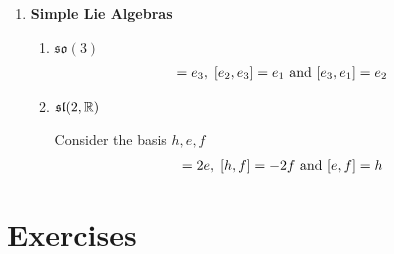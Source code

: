 \documentclass[12pt,a4paper]{report}
\begin{document}
\begin{description}
\begin{enumerate}
		\item \textbf{Simple Lie Algebras}
		
		\begin{enumerate}
			\item $\mathfrak{so}(3)$
				\begin{align*}
					[e_1, e_2] = e_3, \; [e_2, e_3] = e_1 \AND [e_3, e_1]=e_2
				\end{align*}
			\item $\mathfrak{sl}(2, \mathbb{R})$
			
			Consider the basis $h, e, f$
			\begin{align*}
				[h,e] = 2e,\;[h,f]=-2f \AND [e,f]=h
			\end{align*}
		\end{enumerate}
		
		
	\end{enumerate}
\end{description}

\section{Exercises}
\end{document}
